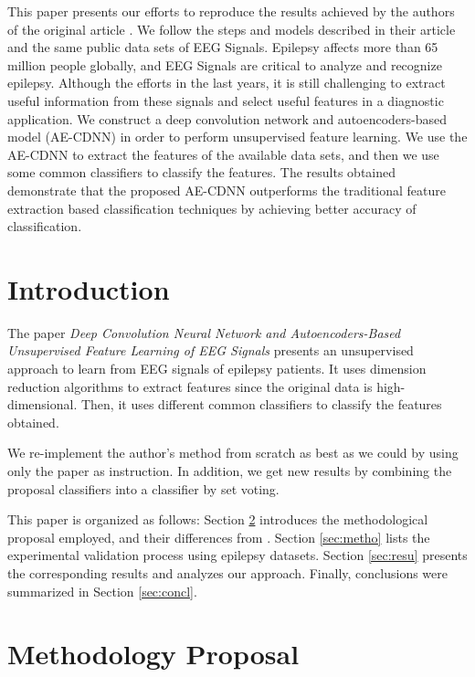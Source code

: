 
This paper presents our efforts to reproduce the results achieved by the authors of the original article \cite{WenZha:2018}. We follow the steps and models described in their article and the same public data sets of EEG Signals. Epilepsy affects more than 65 million people globally, and EEG Signals are critical to analyze and recognize epilepsy. Although the efforts in the last years, it is still challenging to extract useful information from these signals and select useful features in a diagnostic application. We construct a deep convolution network and autoencoders-based model (AE-CDNN) in order to perform unsupervised feature learning. We use the AE-CDNN to extract the features of the available data sets, and then we use some common classifiers to classify the features. The results obtained demonstrate that the proposed AE-CDNN outperforms the traditional feature extraction based classification techniques by achieving better accuracy of classification.

\section{Introduction}

The paper {\it Deep Convolution Neural Network and Autoencoders-Based Unsupervised Feature Learning of EEG Signals} \cite{WenZha:2018} presents an unsupervised approach to learn from EEG signals of epilepsy patients. It uses dimension reduction algorithms to extract features since the original data is high-dimensional. Then, it uses different common classifiers to classify the features obtained. 	

We re-implement the author's method from scratch as best as we could by using only the paper as instruction. In addition, we get new results by combining the proposal classifiers into a classifier by set voting.

This paper is organized as follows: Section \ref{sec:propose} introduces the methodological proposal employed, and their differences from \cite{WenZha:2018}. Section \ref{sec:metho} lists the experimental validation process using epilepsy datasets. Section \ref{sec:resu} presents the corresponding results and analyzes our approach. Finally, conclusions were summarized in Section \ref{sec:concl}.



\section{Methodology Proposal}
\label{sec:propose}

